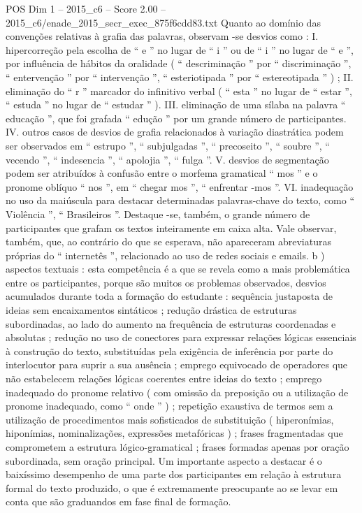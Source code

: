 \begin{textsample}{POS Dim 1 – 2015\_c6 – Score 2.00 – 2015\_c6/enade\_2015\_secr\_exec\_875f6cdd83.txt}
Quanto ao domínio das convenções relativas à grafia das palavras, observam -se desvios como : I. hipercorreção pela escolha de “ e ” no lugar de “ i ” ou de “ i ” no lugar de “ e ”, por influência de hábitos da oralidade ( “ descriminação ” por “ discriminação ”, “ entervenção ” por “ intervenção ”, “ esteriotipada ” por “ estereotipada ” ) ; II. eliminação do “ r ” marcador do infinitivo verbal ( “ esta ” no lugar de “ estar ”, “ estuda ” no lugar de “ estudar ” ).
III. eliminação de uma sílaba na palavra “ educação ”, que foi grafada “ edução ” por um grande número de participantes.
IV. outros casos de desvios de grafia relacionados à variação diastrática podem ser observados em “ estrupo ”, “ subjulgadas ”, “ precoseito ”, “ soubre ”, “ vecendo ”, “ indesencia ”, “ apolojia ”, “ fulga ”.
V. desvios de segmentação podem ser atribuídos à confusão entre o morfema gramatical “ mos ” e o pronome oblíquo “ nos ”, em “ chegar mos ”, “ enfrentar -mos ”.
VI. inadequação no uso da maiúscula para destacar determinadas palavras-chave do texto, como “ Violência ”, “ Brasileiros ”.
Destaque -se, também, o grande número de participantes que grafam os textos inteiramente em caixa alta.
Vale observar, também, que, ao contrário do que se esperava, não apareceram abreviaturas próprias do “ internetês ”, relacionado ao uso de redes sociais e emails. b ) aspectos textuais : esta competência é a que se revela como a mais problemática entre os participantes, porque são muitos os problemas observados, desvios acumulados durante toda a formação do estudante : sequência justaposta de ideias sem encaixamentos sintáticos ; redução drástica de estruturas subordinadas, ao lado do aumento na frequência de estruturas coordenadas e absolutas ; redução no uso de conectores para expressar relações lógicas essenciais à construção do texto, substituídas pela exigência de inferência por parte do interlocutor para suprir a sua ausência ; emprego equivocado de operadores que não estabelecem relações lógicas coerentes entre ideias do texto ; emprego inadequado do pronome relativo ( com omissão da preposição ou a utilização de pronome inadequado, como “ onde ” ) ; repetição exaustiva de termos sem a utilização de procedimentos mais sofisticados de substituição ( hiperonímias, hiponímias, nominalizações, expressões metafóricas ) ; frases fragmentadas que comprometem a estrutura lógico-gramatical ; frases formadas apenas por oração subordinada, sem oração principal.
Um importante aspecto a destacar é o baixíssimo desempenho de uma parte dos participantes em relação à estrutura formal do texto produzido, o que é extremamente preocupante ao se levar em conta que são graduandos em fase final de formação.

\end{textsample}
